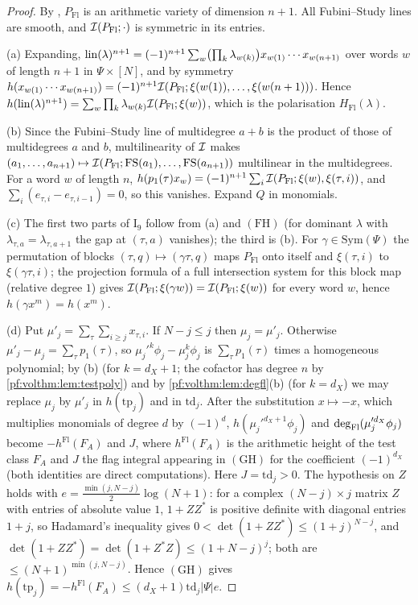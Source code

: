 \begin{proof}
By , $P_{\mathrm{Fl}}$ is an arithmetic variety of
dimension $n+1$. All Fubini--Study lines are smooth, and $\mathcal{I}(P_{\mathrm{Fl}};\cdot)$ is symmetric in its
entries.

(a) Expanding, $\mathrm{lin}(\lambda)^{n+1}=(-1)^{n+1}\sum_w\bigl(\prod_k\lambda_{w(k)}\bigr)x_{w(1)}\cdots x_{w(n+1)}$
over words $w$ of length $n+1$ in $\Psi\times[N]$, and by symmetry $h(x_{w(1)}\cdots x_{w(n+1)})=(-1)^{n+1}
\mathcal{I}(P_{\mathrm{Fl}};\xi(w(1)),\dots,\xi(w(n+1)))$. Hence $h(\mathrm{lin}(\lambda)^{n+1})=\sum_w\prod_k\lambda_{w(k)}
\mathcal{I}(P_{\mathrm{Fl}};\xi(w))$, which is the polarisation $H_{\mathrm{Fl}}(\lambda)$.

(b) Since the Fubini--Study line of multidegree $a+b$ is the product of those of multidegrees $a$ and $b$,
multilinearity of $\mathcal{I}$ makes $(a_1,\dots,a_{n+1})\mapsto\mathcal{I}(P_{\mathrm{Fl}};\mathrm{FS}(a_1),\dots,
\mathrm{FS}(a_{n+1}))$ multilinear in the multidegrees. For a word $w$ of length $n$,
$h(p_1(\tau)x_w)=(-1)^{n+1}\sum_i\mathcal{I}(P_{\mathrm{Fl}};\xi(w),\xi(\tau,i))$, and
$\sum_i(e_{\tau,i}-e_{\tau,i-1})=0$, so this vanishes. Expand $Q$ in monomials.

(c) The first two parts of $\mathrm{I}_9$ follow from (a) and $(\mathrm{FH})$ (for dominant $\lambda$ with
$\lambda_{\tau,a}=\lambda_{\tau,a+1}$ the gap at $(\tau,a)$ vanishes); the third is (b). For $\gamma\in\mathrm{Sym}(\Psi)$
the permutation of blocks $(\tau,q)\mapsto(\gamma\tau,q)$ maps $P_{\mathrm{Fl}}$ onto itself and $\xi(\tau,i)$ to
$\xi(\gamma\tau,i)$; the projection formula of a full intersection system for this block map (relative degree
$1$) gives $\mathcal{I}(P_{\mathrm{Fl}};\xi(\gamma w))=\mathcal{I}(P_{\mathrm{Fl}};\xi(w))$ for every word $w$, hence
$h(\gamma x^m)=h(x^m)$.

(d) Put $\mu'_j=\sum_\tau\sum_{i\ge j}x_{\tau,i}$. If $N-j\le j$ then $\mu_j=\mu'_j$. Otherwise
$\mu'_j-\mu_j=\sum_\tau p_1(\tau)$, so $\mu_j'^{k}\phi_j-\mu_j^{k}\phi_j$ is $\sum_\tau p_1(\tau)$ times a homogeneous
polynomial; by (b) (for $k=d_X+1$; the cofactor has degree $n$ by \cref{pf:volthm:lem:testpoly}) and by
\cref{pf:volthm:lem:degfl}(b) (for $k=d_X$) we may replace $\mu_j$ by $\mu'_j$ in $h(\mathrm{tp}_j)$ and in
$\mathrm{td}_j$. After the substitution $x\mapsto-x$, which multiplies monomials of degree $d$ by $(-1)^d$,
$h(\mu_j'^{d_X+1}\phi_j)$ and $\deg_{\mathrm{Fl}}(\mu_j'^{d_X}\phi_j)$ become $-h^{\mathrm{Fl}}(F_A)$ and $J$, where
$h^{\mathrm{Fl}}(F_A)$ is the arithmetic height of the test class $F_A$ and $J$ the flag integral appearing in
$(\mathrm{GH})$ for the coefficient $(-1)^{d_X}$ (both identities are direct computations). Here $J=\mathrm{td}_j>0$. The hypothesis on $Z$ holds with
$e=\frac{\min(j,N-j)}2\log(N+1)$: for a complex $(N-j)\times j$ matrix $Z$ with entries of absolute value $1$,
$1+ZZ^*$ is positive definite with diagonal entries $1+j$, so Hadamard's inequality gives
$0<\det(1+ZZ^*)\le(1+j)^{N-j}$, and $\det(1+ZZ^*)=\det(1+Z^*Z)\le(1+N-j)^j$; both are $\le(N+1)^{\min(j,N-j)}$.
Hence $(\mathrm{GH})$ gives $h(\mathrm{tp}_j)=-h^{\mathrm{Fl}}(F_A)\le(d_X+1)\mathrm{td}_j|\Psi|e$.
\end{proof}

